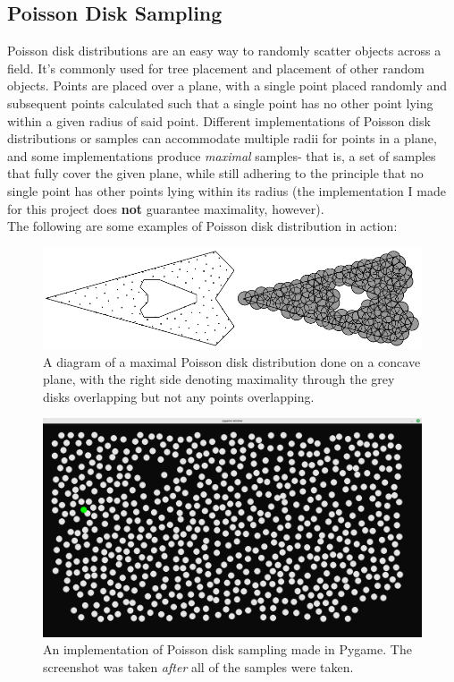\subsection{Poisson Disk Sampling}

Poisson disk distributions are an easy way to randomly scatter objects across a field. It's commonly used for tree placement and placement of other random objects. Points are placed over a plane, with a single point placed randomly and subsequent points calculated such that a single point has no other point lying within a given radius of said point. Different implementations of Poisson disk distributions or samples can accommodate multiple radii for points in a plane, and some implementations produce \textit{maximal} samples- that is, a set of samples that fully cover the given plane, while still adhering to the principle that no single point has other points lying within its radius (the implementation I made for this project does \textbf{not} guarantee maximality, however).\\The following are some examples of Poisson disk distribution in action:

\begin{figure}[H]
    \centering
    \includegraphics[width=\textwidth]{Images/maximalpoissonsample.png}
    \caption{A diagram of a maximal Poisson disk distribution done on a concave plane, with the right side denoting maximality through the grey disks overlapping but not any points overlapping.\cite{10.1145/1964921.1964944}}
    \label{fig:maximalpoisson}
\end{figure}

\begin{figure}[H]
    \centering
    \includegraphics[width=\textwidth]{Images/pygamepoissonsample.png}
    \caption{An implementation of Poisson disk sampling made in Pygame.\cite{pygamepoissondisksampling} The screenshot was taken \textit{after} all of the samples were taken.}
    \label{fig:pygamepoisson}
\end{figure}

